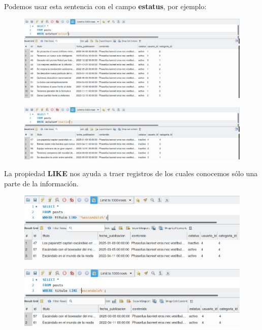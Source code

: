 \documentclass{article}
\begin{document}
Podemos usar esta sentencia con el campo \textbf{estatus}, por ejemplo:
\begin{figure}[h!]
  \centering
  \includegraphics[scale=0.75]{./Pictures/105_where.png}
\end{figure}

\begin{figure}[h!]
  \centering
  \includegraphics[scale=0.75]{./Pictures/106_where_estatus.png}
\end{figure}

La propiedad \textbf{LIKE} nos ayuda a traer registros de los cuales conocemos
sólo una parte de la información.
\begin{figure}[h!]
  \centering
  \includegraphics[scale=0.75]{./Pictures/108_where_like.png}
\end{figure}

\begin{figure}[h!]
  \centering
  \includegraphics[scale=0.75]{./Pictures/109_where_like.png}
\end{figure}
\end{document}
